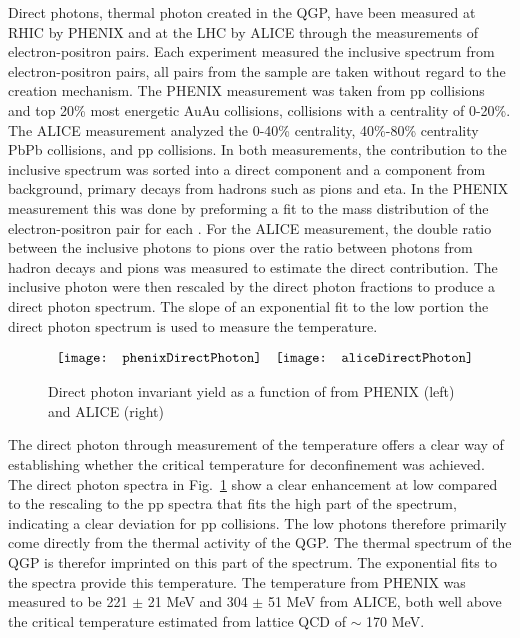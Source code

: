       Direct photons, thermal photon created in the QGP, have been measured 
        at RHIC by PHENIX \cite{phenixPhoton2010} and at the LHC by ALICE 
        \cite{photonALICE} through the measurements of electron-positron pairs.
      Each experiment measured the inclusive \pt{} spectrum from 
        electron-positron pairs, all pairs from the sample are taken without
        regard to the creation mechanism.
      The PHENIX measurement was taken from pp collisions and top 20\% most 
        energetic AuAu collisions, collisions with a centrality of 0-20\%. 
      The ALICE measurement analyzed the 0-40\% centrality, 40\%-80\% centrality
        PbPb collisions, and pp collisions. 
      In both measurements, the contribution to the inclusive spectrum was sorted 
        into a direct component and a component from background, primary decays
        from hadrons such as pions and eta. 
      In the PHENIX measurement this was done by preforming a fit to the mass 
        distribution of the electron-positron pair for each \pt{}.
      For the ALICE measurement, the double ratio between the inclusive photons 
        to pions over the ratio between photons from hadron decays and pions was
        measured to estimate the direct contribution. 
      The inclusive photon \pt{} were then rescaled by the direct photon 
        fractions to produce a direct photon spectrum.
      The slope of an exponential fit to the low \pt{} portion the direct photon 
        spectrum is used to measure the temperature.
      \begin{figure}[!Hhbt]
        \centering
        $ \begin{array}{c c}
          \texttt{[image: phenixDirectPhoton]} &
          \texttt{[image: aliceDirectPhoton]}
        \end{array} $
        \caption{Direct photon invariant yield as a function of \pt{} from 
          PHENIX \cite{phenixPhoton2010} (left) and ALICE \cite{photonALICE} 
          (right)}
        \label{fig:directPhotonPt}
      \end{figure}
  
      The direct photon through measurement of the temperature offers a clear 
        way of establishing whether the critical temperature for deconfinement
        was achieved. 
      The direct photon \pt{} spectra in Fig.~\ref{fig:directPhotonPt} show a 
        clear enhancement at low \pt{} compared to the rescaling to the pp 
        spectra that fits the high \pt{} part of the spectrum, indicating a 
        clear deviation for pp collisions.
      The low \pt{} photons therefore primarily come directly from the thermal 
        activity of the QGP.
      The thermal spectrum of the QGP is therefor imprinted on this part of the 
        spectrum.
      The exponential fits to the spectra provide this temperature. 
      The temperature from PHENIX was measured to be 221 $\pm$ 21 MeV and 
        304 $\pm$ 51 MeV from ALICE, both well above the critical temperature
        estimated from lattice QCD of $\sim$ 170 MeV.
  
